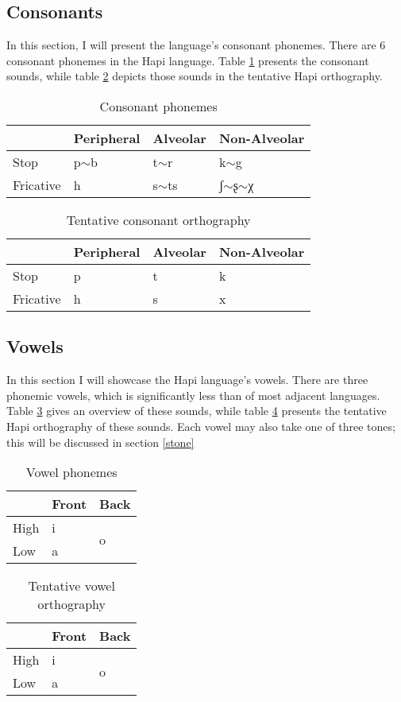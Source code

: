 \documentclass[a4paper, 12pt, oneside]{memoir}
\begin{document}
\subsection{Consonants}\label{scons}
In this section, I will present the language's consonant phonemes. There are 6 consonant phonemes in the Hapi language. Table \ref{cphon} presents the consonant sounds, while table \ref{cortho} depicts those sounds in the tentative Hapi orthography.
\begin{table}[H]
\centering
\begin{tabular}{@{}llll@{}}
\toprule
 & Peripheral & Alveolar & Non-Alveolar \\ \midrule
Stop & p$\sim$b & t$\sim$r & k$\sim$g \\
Fricative & h & s$\sim$ts & ʃ$\sim$ʂ$\sim$χ \\ \bottomrule
\end{tabular}
\caption{Consonant phonemes}
\label{cphon}
\end{table}
\begin{table}[H]
\centering
\begin{tabular}{@{}llll@{}}
\toprule
 & Peripheral & Alveolar & Non-Alveolar \\ \midrule
Stop & p & t & k \\
Fricative & h & s & x \\ \bottomrule
\end{tabular}
\caption{Tentative consonant orthography}
\label{cortho}
\end{table}
\subsection{Vowels}\label{svow}
In this section I will showcase the Hapi language's vowels. There are three phonemic vowels, which is significantly less than of most adjacent languages. Table \ref{vphon} gives an overview of these sounds, while table \ref{vortho} presents the tentative Hapi orthography of these sounds. Each vowel may also take one of three tones; this will be discussed in section \ref{stone}
\begin{table}[H]
\centering
\begin{tabular}{@{}lll@{}}
\toprule
 & Front & Back \\ \midrule
High & i & \multirow{2}{*}{o} \\
Low & a &  \\ \bottomrule
\end{tabular}
\caption{Vowel phonemes}
\label{vphon}
\end{table}
\begin{table}[H]
\centering
\begin{tabular}{@{}lll@{}}
\toprule
 & Front & Back \\ \midrule
High & i & \multirow{2}{*}{o} \\
Low & a &  \\ \bottomrule
\end{tabular}
\caption{Tentative vowel orthography}
\label{vortho}
\end{table}
\end{document}

